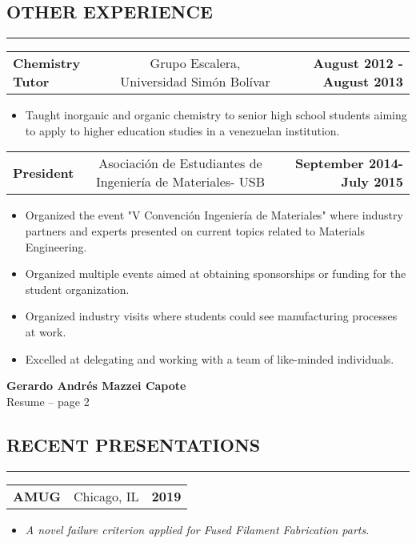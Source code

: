 \documentclass[11pt,letterpaper]{article}
\makeatletter
\newcommand{\headerrow}[3]
{\vspace{0.4em}
\noindent
\begin{tabular*}{\textwidth}{l @{\extracolsep{\fill}} cr}
	\textbf{#1} & %
	#2 &		  %
	\textbf{#3}\\ %
\end{tabular*}}
\makeatother
\begin{document}
\subsection*{OTHER EXPERIENCE}

\vspace{-0.5em}
\hrule
	
	\headerrow
		{Chemistry Tutor}
		{Grupo Escalera, Universidad Simón Bolívar} %
		{August 2012 - August 2013}
	\begin{itemize}
		\item Taught inorganic and organic chemistry to senior high school students aiming to apply to higher education studies in a venezuelan institution.
\end{itemize}	
	\headerrow
		{President}
		{Asociación de Estudiantes de Ingeniería de Materiales- USB} %
		{September 2014- July 2015}
		\begin{itemize}
			\item Organized the event "V Convención Ingeniería de Materiales" where industry partners and experts presented on current topics related to Materials Engineering.
			\item Organized multiple events aimed at obtaining sponsorships or funding for the student organization.
			\item Organized industry visits where students could see manufacturing processes at work. 
			\item Excelled at delegating and working with a team of like-minded individuals.
	\end{itemize}
	
\pagebreak %
\thispagestyle{empty} %

\begin{center}
	\LARGE \textbf{Gerardo Andrés Mazzei Capote} \\
	\normalsize Resume -- page 2
\end{center}

\subsection*{RECENT PRESENTATIONS}

	\vspace{-0.5em}
	\hrule
	\headerrow
		{AMUG}
		{Chicago, IL}
		{2019}
	\begin{itemize}
		\item \emph{A novel failure criterion applied for Fused Filament Fabrication parts}.
	\end{itemize}
\end{document}
